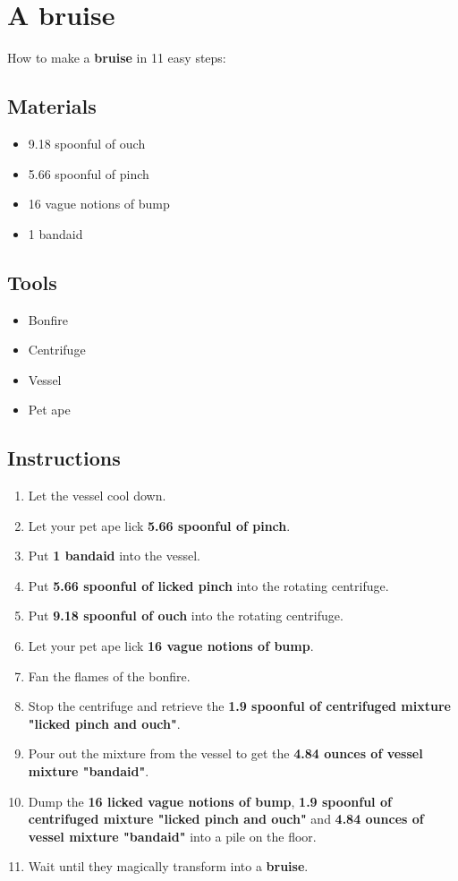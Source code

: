 \documentclass{article}
\begin{document}
\section{A bruise}How to make a \textbf{bruise} in 11 easy steps:

\subsection{Materials}\begin{itemize}
\item 
9.18 spoonful of ouch
\item 
5.66 spoonful of pinch
\item 
16 vague notions of bump
\item 
1 bandaid
\end{itemize}
\subsection{Tools}\begin{itemize}
\item 
Bonfire
\item 
Centrifuge
\item 
Vessel
\item 
Pet ape
\end{itemize}
\subsection{Instructions}\begin{enumerate}
\item 
Let the vessel cool down.
\item 
Let your pet ape lick \textbf{5.66 spoonful of pinch}.
\item 
Put \textbf{1 bandaid} into the vessel.
\item 
Put \textbf{5.66 spoonful of licked pinch} into the rotating centrifuge.
\item 
Put \textbf{9.18 spoonful of ouch} into the rotating centrifuge.
\item 
Let your pet ape lick \textbf{16 vague notions of bump}.
\item 
Fan the flames of the bonfire.
\item 
Stop the centrifuge and retrieve the \textbf{1.9 spoonful of centrifuged mixture "licked pinch and ouch"}.
\item 
Pour out the mixture from the vessel to get the \textbf{4.84 ounces of vessel mixture "bandaid"}.
\item 
Dump the \textbf{16 licked vague notions of bump}, \textbf{1.9 spoonful of centrifuged mixture "licked pinch and ouch"} and \textbf{4.84 ounces of vessel mixture "bandaid"} into a pile on the floor.
\item 
Wait until they magically transform into a \textbf{bruise}.
\end{enumerate}
\newpage
\end{document}
